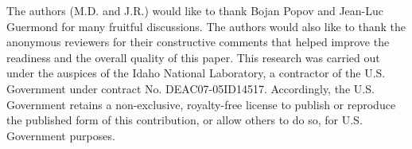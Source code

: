 
\begin{acknowledgements}
The authors (M.D. and J.R.) would like to thank Bojan Popov and Jean-Luc Guermond for many fruitful discussions. The authors would also like to thank the anonymous reviewers
for their constructive comments that helped improve the readiness and the overall quality of this paper. 
This research was carried out under the auspices of the Idaho National Laboratory, a contractor of the U.S. Government under contract No. DEAC07-05ID14517.  Accordingly, the U.S. Government retains a non-exclusive, royalty-free license to publish or reproduce the published form of this contribution, or allow others to do so, for U.S. Government purposes.
\end{acknowledgements}


\clearpage


